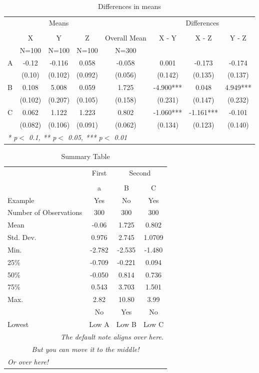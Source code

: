 \begin{table}[!ht]
  \centering
  \caption{Differences in means}
  \label{table:differencesinmeans}
\begin{tabular}{lccccccc}
  \toprule
  \toprule
  & \multicolumn{3}{c}{Means} & \multicolumn{1}{c}{} & \multicolumn{3}{c}{Differences} \\
  \cmidrule(lr){2-4}\cmidrule(lr){6-8} \\
   & X & Y & Z & Overall Mean & X - Y & X - Z & Y - Z\\
   & N=100 & N=100 & N=100 & N=300 &  &  & \\
  \midrule
  A & -0.12 & -0.116 & 0.058 & -0.058 & 0.001 & -0.173 & -0.174 \\
   & (0.10) & (0.102) & (0.092) & (0.056) & (0.142) & (0.135) & (0.137) \\
  B & 0.108 & 5.008 & 0.059 & 1.725 & -4.900*** & 0.048 & 4.949*** \\
   & (0.102) & (0.207) & (0.105) & (0.158) & (0.231) & (0.147) & (0.232) \\
  C & 0.062 & 1.122 & 1.223 & 0.802 & -1.060*** & -1.161*** & -0.101 \\
   & (0.082) & (0.106) & (0.091) & (0.062) & (0.134) & (0.123) & (0.140) \\
  \bottomrule
  \multicolumn{8}{l}{{\small \textit{* p$<$ 0.1, ** p$<$ 0.05, *** p$<$ 0.01}}}\\
\end{tabular}
\end{table}
\begin{table}[!ht]
  \centering
  \caption{Summary Table}
  \label{table:summarytable}
\begin{tabular}{lccc}
  \toprule
  \toprule
  & \multicolumn{1}{c}{First} & \multicolumn{2}{c}{Second} \\
  \cmidrule(lr){2-2}\cmidrule(lr){3-4} \\
   & a & B & C\\
  Example & Yes & No & Yes\\
  \midrule
  Number of Observations & 300 & 300 & 300 \\
  Mean & -0.06 & 1.725 & 0.802 \\
  Std. Dev. & 0.976 & 2.745 & 1.0709 \\
  Min. & -2.782 & -2.535 & -1.480 \\
  25\% & -0.709 & -0.221 & 0.094 \\
  50\% & -0.050 & 0.814 & 0.736 \\
  75\% & 0.543 & 3.703 & 1.501 \\
  Max. & 2.82 & 10.80 & 3.99 \\
   & No & Yes & No\\
  \bottomrule
  Lowest & Low A & Low B & Low C\\
  \bottomrule
  \multicolumn{4}{r}{{\small \textit{The default note aligns over here.}}}\\
  \multicolumn{4}{c}{{\small \textit{But you can move it to the middle!}}}\\
  \multicolumn{4}{l}{{\small \textit{Or over here!}}}\\
\end{tabular}
\end{table}
